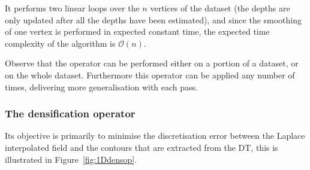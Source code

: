 It performs two linear loops over the $n$ vertices of the dataset (the depths are only updated after all the depths have been estimated), and since the smoothing of one vertex is performed in expected constant time, the expected time complexity of the algorithm is $\mathcal{O}(n)$.

Observe that the operator can be performed either on a portion of a dataset, or on the whole dataset. 
Furthermore this operator can be applied any number of times, delivering more generalisation with each pass.


%
\subsubsection{The densification operator}
\label{sec:densification}

Its objective is primarily to minimise the discretisation error between the Laplace interpolated field and the contours that are extracted from the DT, this is illustrated in Figure~\ref{fig:1Ddensop}.
